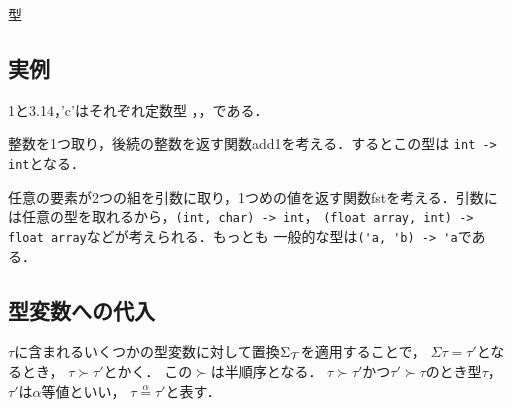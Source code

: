 \documentclass[a4paper,titlepage,report,disablejfam]{jsbook}
\begin{document}
\begin{resbonsiblesection}{型}{\sakamoto}
\subsection{実例}\label{ssc:example}
1と3.14，'c'はそれぞれ定数型
，，である．

整数を1つ取り，後続の整数を返す関数add1を考える．するとこの型は
\lstinline|int -> int|となる．

任意の要素が2つの組を引数に取り，1つめの値を返す関数fstを考える．引数に
は任意の型を取れるから，\lstinline|(int, char) -> int|，
\lstinline|(float array, int) -> float array|などが考えられる．もっとも
一般的な型は\lstinline|('a, 'b) -> 'a|である．


\subsection{型変数への代入}\label{ssc:type-order}
$\tau$に含まれるいくつかの型変数に対して置換${\Sigma_{\mathcal{T}}}$を適用することで，
$\Sigma\tau=\tau'$となるとき，
$\tau\succ\tau'$とかく．
この$\succ$は半順序となる．
$\tau\succ\tau'$かつ$\tau'\succ\tau$のとき型$\tau$，$\tau'$は$\alpha$等値といい，
$\tau\mathrel{\overset{\alpha}{=}}\tau'$と表す．
\end{resbonsiblesection}
\end{document}
